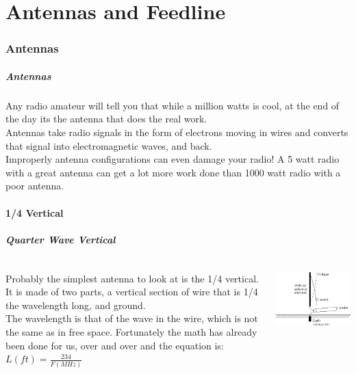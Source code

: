 \documentclass[10pt]{beamer}
\begin{document}
\part{Antennas and Feedline}

\section{Antennas}
\begin{frame}
\frametitle{Antennas}
Any radio amateur will tell you that while a million watts is cool, at the end of the day its the antenna that does the real work.\\
Antennas take radio signals in the form of electrons moving in wires and converts that signal into electromagnetic waves, and back.\\
Improperly antenna configurations can even damage your radio! A 5 watt radio with a great antenna can get a lot more work done than 1000 watt radio with a poor antenna.
\end{frame}

\subsection{1/4 Vertical}
\begin{frame}
\frametitle{Quarter Wave Vertical}
\begin{columns}
\begin{column}{.6\textwidth}
Probably the simplest antenna to look at is the 1/4 vertical. It is made of two parts, a vertical section of wire that is 1/4 the wavelength long, and ground.\\
The wavelength is that of the wave in the wire, which is not the same as in free space. Fortunately the math has already been done for us, over and over and the equation is: $L\left(ft\right) = \frac{234}{F \left(MHz\right)}$
\end{column}
\begin{column}{.4\textwidth}
\includegraphics[width=\textwidth]{qwavevert.png}
\end{column}
\end{columns}
\end{frame}
\end{document}
